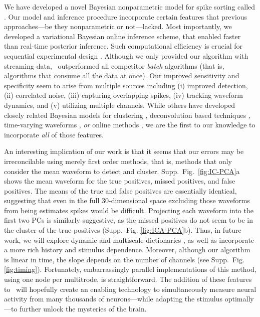 
We have developed a novel Bayesian nonparametric model for spike sorting called \smug.  Our model and inference procedure incorporate certain features that previous approaches---be they nonparametric or not---lacked.  Most importantly, we developed a variational Bayesian online inference scheme, that enabled faster than real-time posterior inference.  Such computational efficiency is crucial for sequential experimental design \cite{}.  Although we only provided our algorithm with streaming data, \smug\ outperformed all competitor \emph{batch} algorithms (that is, algorithms that consume all the data at once). Our improved sensitivity and specificity seem to arise from multiple sources including (i) improved detection, (ii) correlated noise, (iii) capturing overlapping spikes, (iv) tracking waveform dynamics, and (v) utilizing multiple channels.  While others have developed closely related Bayesian models for clustering \cite{WoodBla2008,wood2009}, deconvolution based techniques \cite{Pillow2013}, time-varying waveforms \cite{calabrese2011kalman},  \emph{or} online methods \cite{OSORT, Franke2010}, we are the first to our knowledge to incorporate \emph{all} of those features.

An interesting implication of our work is that it seems that our errors may be irreconcilable using merely first order methods, that is, methods that only consider the mean waveform to detect and cluster.  Supp.\ Fig.\ \ref{fig:IC-PCA}a shows the mean waveform for the true positives, missed positives, and false positives.  The means of the true and false positives are essentially identical, suggesting that even in the full 30-dimensional space excluding those waveforms from being estimates spikes would be difficult.  Projecting each waveform into the first two PCs is similarly suggestive, as the missed positives do not seem to be in the cluster of the true positives (Supp.\ Fig. \ref{fig:ICA-PCA}b). Thus, in future work, we will explore dynamic and multiscale dictionaries \cite{ChenMaggioni12}, as well as incorporate a more rich history and stimulus dependence.  
Moreover, although our algorithm is linear in time, the slope depends on the number of channels (see Supp.\ Fig. \ref{fig:timing}).  Fortunately, embarrassingly parallel implementations of this method, using one node per multitrode, is straightforward.  The addition of these features to \smug\ will hopefully create an enabling technology to  simultaneously measure neural activity from many thousands of neurons---while adapting the stimulus optimally---to further unlock the mysteries of the brain.






